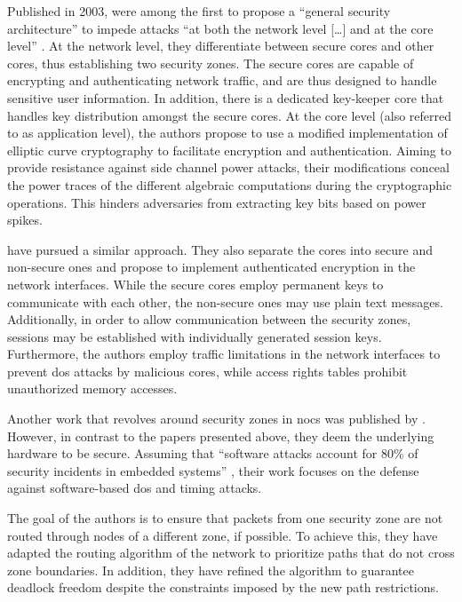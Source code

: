 Published in 2003, \citeauthor{gebotys03securityframework} \cite{gebotys03securityframework} were among the first to propose a \enquote{general security architecture}
\cite[1]{gebotys03securityframework} to impede attacks \enquote{at both the network level […] and at the core level}
\cite[1]{gebotys03securityframework}. At the network level, they differentiate between secure cores and other cores, thus establishing two security
zones. The secure cores are capable of encrypting and authenticating network
traffic, and are thus designed to handle sensitive user information. In addition, there is a dedicated key-keeper core that handles key distribution
amongst the secure cores. At the core level (also referred to as application level), the authors propose to use a modified implementation of elliptic curve
cryptography to facilitate encryption and authentication. Aiming to provide resistance against side channel power attacks, their modifications conceal
the power traces of the different algebraic computations during the cryptographic operations. This hinders adversaries from extracting key bits based
on power spikes.

\citeauthor{kapoor13nocauthenc} \cite{kapoor13nocauthenc} have pursued a similar approach. They also separate the cores into secure and non-secure
ones and propose to implement authenticated encryption in the network interfaces. While the secure
cores employ permanent keys to communicate with each other, the non-secure ones may use plain text messages. Additionally, in order to allow
communication between the security zones, sessions may be established with individually generated session keys. Furthermore, the authors employ
traffic limitations in the network interfaces to prevent \gls{dos} attacks by malicious cores, while access rights tables prohibit unauthorized
memory accesses.

Another work that revolves around security zones in \glspl{noc} was published by \citeauthor{fernandes16nocrouting} \cite{fernandes16nocrouting}.
However, in contrast to the papers presented above, they deem the underlying hardware to be secure. Assuming that \enquote{software attacks account
for 80\% of security incidents in embedded systems} \cite[1]{fernandes16nocrouting}, their work focuses on the defense against software-based
\gls{dos} and timing attacks.

The goal of the authors is to ensure that packets from one security zone are not routed through nodes of a different zone, if possible. To achieve
this, they have adapted the routing algorithm of the network to prioritize paths that do not cross zone boundaries. In addition, they have
refined the algorithm to guarantee deadlock freedom despite the constraints imposed by the new path restrictions.

